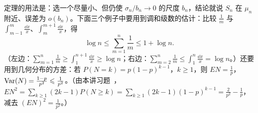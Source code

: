 定理的用法是：选一个尽量小、但仍使 $\sigma_n/b_n\to0$ 的尺度 $b_n$，结论就说 $S_n$ 在 $\mu_n$ 附近、误差为 $o(b_n)$。下面三个例子中要用到调和级数的估计：比较 $\frac1m$ 与 $\int_{m-1}^m\frac{\dd x}x$、$\int_m^{m+1}\frac{\dd x}x$，得
\begin{equation}\label{eq:weak-laws:harmonic}
\log n\leqslant\sum_{m=1}^n\frac1m\leqslant1+\log n .
\end{equation}
（左边：$\sum_{m=1}^n\frac1m\geqslant\int_1^{n+1}\frac{\dd x}x\geqslant\log n$；右边：$\sum_{m=2}^n\frac1m\leqslant\int_1^n\frac{\dd x}x=\log n$。）还要用到几何分布的方差：若 $P(N=k)=p(1-p)^{k-1}$，$k\geqslant1$，则 $EN=\frac1p$，$\operatorname{Var}(N)=\frac{1-p}{p^2}\leqslant\frac1{p^2}$。（由本讲习题~，$EN^2=\sum_{k\geqslant1}(2k-1)P(N\geqslant k)=\sum_{k\geqslant1}(2k-1)(1-p)^{k-1}=\frac2{p^2}-\frac1p$，减去 $(EN)^2=\frac1{p^2}$。）

